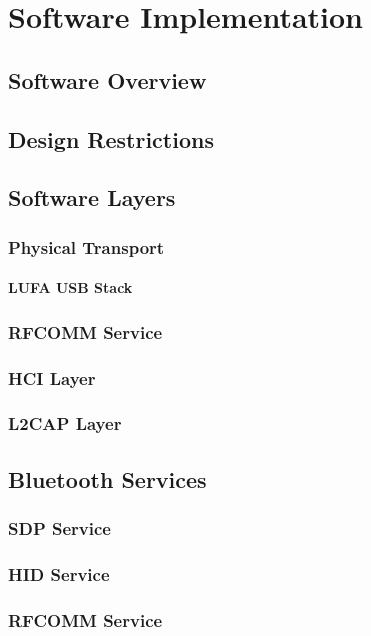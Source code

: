 \chapter{Software Implementation}
\label{Chapter 3}


\section{Software Overview}


\section{Design Restrictions}


\section{Software Layers}


\subsection{Physical Transport}


\subsubsection{LUFA USB Stack}


\subsection{RFCOMM Service}


\subsection{HCI Layer}


\subsection{L2CAP Layer}


\section{Bluetooth Services}


\subsection{SDP Service}


\subsection{HID Service}


\subsection{RFCOMM Service}

